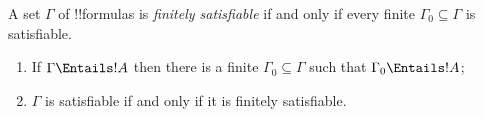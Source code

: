 \documentclass[../../include/open-logic-section]{subfiles}
\begin{document}

\begin{defn}
  A set $\Gamma$ of !!{formula}s is \emph{finitely satisfiable} if and
  only if every finite $\Gamma_0 \subseteq \Gamma$ is satisfiable.
\end{defn}

\begin{thm}
\begin{enumerate}
  \item If $\Gamma \Entails !A$ then there is a finite $\Gamma_0
    \subseteq \Gamma$ such that $\Gamma_0 \Entails !A$;
  \item $\Gamma$ is satisfiable if and only if it is finitely
    satisfiable. 
\end{enumerate}
\end{thm}

\end{document}
